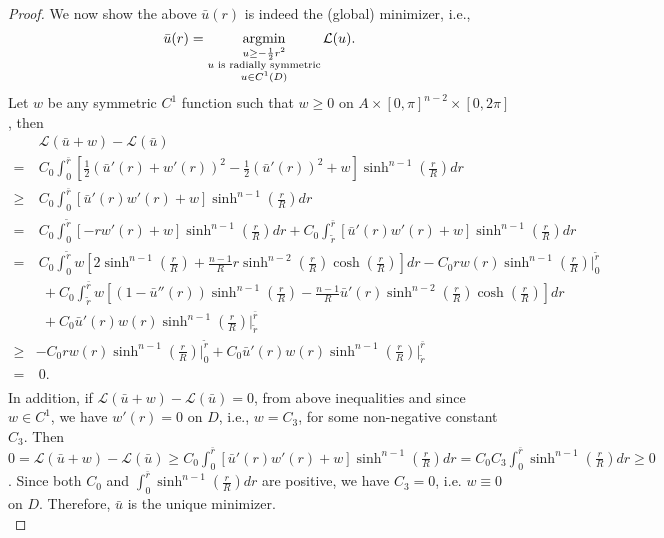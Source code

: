 \begin{proof}
	We now show the above $\bar{u}(r)$ is indeed the (global) minimizer, i.e.,
	\begin{equation*}
	\bar{u}(r)=\argmin\limits_{\substack{u\ge -\frac{1}{2}r^2 \\ u \text{ is radially symmetric}\\ u \in C^1(D)}} \mathcal{L}(u).
	\end{equation*}
	Let $w$ be any symmetric $C^1$ function such that $w\ge 0 $ on $A\times[0,\pi]^{n-2}\times[0,2\pi]$, then 
	\begin{equation*}
	\begin{split}
	&\ \mathcal{L}(\bar{u}+w)-\mathcal{L}(\bar{u})\\
	= &\ C_0 \int_{0}^{\bar{r}} [\frac{1}{2}(\bar{u}'(r)+w'(r))^2-\frac{1}{2}(\bar{u}'(r))^2+w]\sinh^{n-1}(\frac{r}{R}) dr\\
	\ge &\ C_0\int_{0}^{\bar{r}} [\bar{u}'(r)w'(r)+w]\sinh^{n-1}(\frac{r}{R}) dr\\
	=&\ C_0\int_{0}^{\tilde{r}} [-rw'(r)+w]\sinh^{n-1}(\frac{r}{R}) dr + C_0\int_{\tilde{r}}^{\bar{r}} [\bar{u}'(r)w'(r)+w]\sinh^{n-1}(\frac{r}{R}) dr\\
	=&\ C_0\int_{0}^{\tilde{r}} w[2\sinh^{n-1}(\frac{r}{R})+\frac{n-1}{R}r\sinh^{n-2}(\frac{r}{R})\cosh(\frac{r}{R})]dr-C_0rw(r)\sinh^{n-1}(\frac{r}{R})\bigg|_0^{\tilde{r}}\\
	&\ \ + C_0\int_{\tilde{r}}^{\bar{r}} w[(1-\bar{u}''(r))\sinh^{n-1}(\frac{r}{R})-\frac{n-1}{R}\bar{u}'(r)\sinh^{n-2}(\frac{r}{R})\cosh(\frac{r}{R})]dr\\
	&\ \ +C_0\bar{u}'(r)w(r)\sinh^{n-1}(\frac{r}{R})\bigg|_{\tilde{r}}^{\bar{r}}\\
	\ge &-C_0 r w(r)\sinh^{n-1}(\frac{r}{R})\bigg|_0^{\tilde{r}}+C_0\bar{u}'(r)w(r)\sinh^{n-1}(\frac{r}{R})\bigg|_{\tilde{r}}^{\bar{r}}\ \ \ \ \\ %
	=& \ 0.\\
	\end{split}
	\end{equation*}
	In addition, if $\mathcal{L}(\bar{u}+w)-\mathcal{L}(\bar{u})=0$, from above inequalities and since $w \in C^1$, we have $w'(r)=0$ on $D$, i.e., $w=C_3$, for some non-negative constant $C_3$. Then $0= \mathcal{L}(\bar{u}+w)-\mathcal{L}(\bar{u})\ge  C_0\int_{0}^{\bar{r}} [\bar{u}'(r)w'(r)+w]\sinh^{n-1}(\frac{r}{R}) dr =  C_0C_3\int_{0}^{\bar{r}} \sinh^{n-1}(\frac{r}{R}) dr\ge 0$. Since both $C_0$ and $\int_{0}^{\bar{r}} \sinh^{n-1}(\frac{r}{R}) dr$ are positive, we have $C_3 = 0$, i.e. $w\equiv 0 $ on $D$. Therefore, $\bar{u}$ is the unique minimizer.\\
	

\end{proof}
